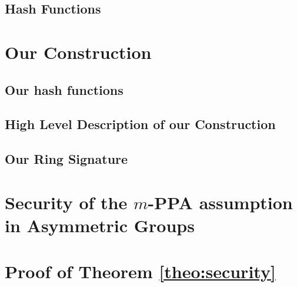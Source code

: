 \documentclass[a4paper,english]{lipics-v2016}
\begin{document}
	\subsection{Hash Functions} \label{sec:hash}

		

    \section{Our Construction} \label{sec:oc}

	\subsection{Our hash functions}

		

	
	
	\subsection{High Level Description of our Construction} \label{sec:high-level}
        
        		
    	
	\subsection{Our Ring Signature}\label{sec:our-construction}
        	 





\appendix

	\section{Security of the $m$-PPA assumption in Asymmetric Groups} \label{sec:aPPA}
	
		

	\section{Proof of Theorem \ref{theo:security}} \label{sec:sec-proof}
\end{document}

